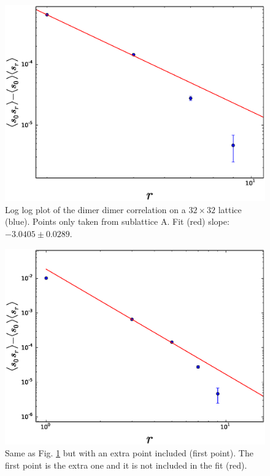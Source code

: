\documentclass[aps,floatfix,11pt]{revtex4-1}
\begin{document}
\begin{figure}[h]
    \centering
    \includegraphics[width=8.5 cm]{s_dimer_dimer_cor_loglog_one_sublat_A_32x32}
    \caption{Log log plot of the dimer dimer correlation on a $32\times32$ lattice (blue). 
        Points only taken from sublattice A. Fit (red) slope: $-3.0405 \pm 0.0289$.
    \label{fig:s_dimer_dimer_cor_loglog_one_sublat_A_32x32}}
\end{figure}

\begin{figure}[h]
    \centering
    \includegraphics[width=8.5 cm]{s_dimer_dimer_cor_loglog_one_sublat_A_32x32_extra_pnt}
    \caption{Same as Fig. \ref{fig:s_dimer_dimer_cor_loglog_one_sublat_A_32x32} but with an extra
        point included (first point). The first point is the extra one and it is not included in the fit (red).
    \label{fig:s_dimer_dimer_cor_loglog_one_sublat_A_32x32_extra_pnt}}
\end{figure}
\end{document}
